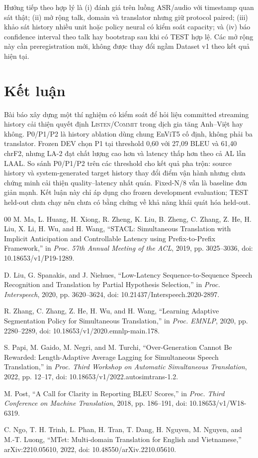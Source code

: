 \documentclass[conference]{IEEEtran}
\newcommand{\listen}{\ifmmode\mathrm{LISTEN}\else\textsc{Listen}\fi}
\newcommand{\commit}{\ifmmode\mathrm{COMMIT}\else\textsc{Commit}\fi}
\begin{document}
Hướng tiếp theo hợp lý là (i) đánh giá trên luồng ASR/audio với timestamp quan sát thật; (ii) mở rộng talk, domain và translator nhưng giữ protocol paired; (iii) khảo sát history nhiều unit hoặc policy neural có kiểm soát capacity; và (iv) báo confidence interval theo talk hay bootstrap sau khi có TEST hợp lệ. Các mở rộng này cần preregistration mới, không được thay đổi ngầm Dataset v1 theo kết quả hiện tại.

\section{Kết luận}
Bài báo xây dựng một thí nghiệm có kiểm soát để hỏi liệu committed streaming history cải thiện quyết định \listen/\commit{} trong dịch gia tăng Anh--Việt hay không. P0/P1/P2 là history ablation dùng chung EnViT5 cố định, không phải ba translator. Frozen DEV chọn P1 tại threshold 0,60 với 27,09 BLEU và 61,40 chrF2, nhưng LA-2 đạt chất lượng cao hơn và latency thấp hơn theo cả AL lẫn LAAL. So sánh P0/P1/P2 trên các threshold cho kết quả pha trộn: source history và system-generated target history thay đổi điểm vận hành nhưng chưa chứng minh cải thiện quality--latency nhất quán. Fixed-N/8 vẫn là baseline đơn giản mạnh. Kết luận này chỉ áp dụng cho frozen development evaluation; TEST held-out chưa chạy nên chưa có bằng chứng về khả năng khái quát hóa held-out.

\begin{thebibliography}{00}
M. Ma, L. Huang, H. Xiong, R. Zheng, K. Liu, B. Zheng, C. Zhang, Z. He, H. Liu, X. Li, H. Wu, and H. Wang, ``STACL: Simultaneous Translation with Implicit Anticipation and Controllable Latency using Prefix-to-Prefix Framework,'' in \emph{Proc. 57th Annual Meeting of the ACL}, 2019, pp. 3025--3036, doi: 10.18653/v1/P19-1289.

D. Liu, G. Spanakis, and J. Niehues, ``Low-Latency Sequence-to-Sequence Speech Recognition and Translation by Partial Hypothesis Selection,'' in \emph{Proc. Interspeech}, 2020, pp. 3620--3624, doi: 10.21437/Interspeech.2020-2897.

R. Zhang, C. Zhang, Z. He, H. Wu, and H. Wang, ``Learning Adaptive Segmentation Policy for Simultaneous Translation,'' in \emph{Proc. EMNLP}, 2020, pp. 2280--2289, doi: 10.18653/v1/2020.emnlp-main.178.

S. Papi, M. Gaido, M. Negri, and M. Turchi, ``Over-Generation Cannot Be Rewarded: Length-Adaptive Average Lagging for Simultaneous Speech Translation,'' in \emph{Proc. Third Workshop on Automatic Simultaneous Translation}, 2022, pp. 12--17, doi: 10.18653/v1/2022.autosimtrans-1.2.

M. Post, ``A Call for Clarity in Reporting BLEU Scores,'' in \emph{Proc. Third Conference on Machine Translation}, 2018, pp. 186--191, doi: 10.18653/v1/W18-6319.

C. Ngo, T. H. Trinh, L. Phan, H. Tran, T. Dang, H. Nguyen, M. Nguyen, and M.-T. Luong, ``MTet: Multi-domain Translation for English and Vietnamese,'' arXiv:2210.05610, 2022, doi: 10.48550/arXiv.2210.05610.
\end{thebibliography}
\end{document}

